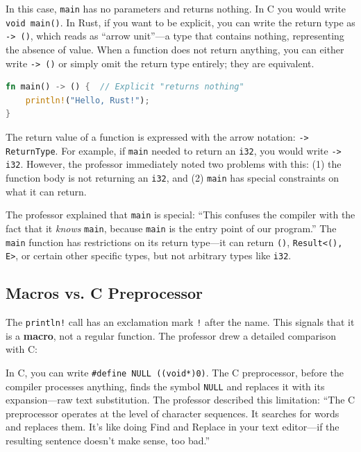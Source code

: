 In this case, \texttt{main} has no parameters and returns nothing. In C you would write \texttt{void main()}. In Rust, if you want to be explicit, you can write the return type as \texttt{-> ()}, which reads as ``arrow unit''---a type that contains nothing, representing the absence of value. When a function does not return anything, you can either write \texttt{-> ()} or simply omit the return type entirely; they are equivalent.

\begin{lstlisting}[language=Rust]
fn main() -> () {  // Explicit "returns nothing"
    println!("Hello, Rust!");
}
\end{lstlisting}

The return value of a function is expressed with the arrow notation: \texttt{-> ReturnType}. For example, if \texttt{main} needed to return an \texttt{i32}, you would write \texttt{-> i32}. However, the professor immediately noted two problems with this: (1) the function body is not returning an \texttt{i32}, and (2) \texttt{main} has special constraints on what it can return.

\begin{warningbox}
The professor explained that \texttt{main} is special: ``This confuses the compiler with the fact that it \emph{knows} \texttt{main}, because \texttt{main} is the entry point of our program.'' The \texttt{main} function has restrictions on its return type---it can return \texttt{()}, \texttt{Result<(), E>}, or certain other specific types, but not arbitrary types like \texttt{i32}.
\end{warningbox}

\subsection{Macros vs. C Preprocessor}

The \texttt{println!} call has an exclamation mark \texttt{!} after the name. This signals that it is a \textbf{macro}, not a regular function. The professor drew a detailed comparison with C:

In C, you can write \texttt{\#define NULL ((void*)0)}. The C preprocessor, before the compiler processes anything, finds the symbol \texttt{NULL} and replaces it with its expansion---raw text substitution. The professor described this limitation: ``The C preprocessor operates at the level of character sequences. It searches for words and replaces them. It's like doing Find and Replace in your text editor---if the resulting sentence doesn't make sense, too bad.''

